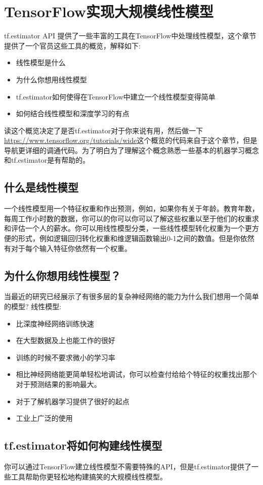 \section{TensorFlow实现大规模线性模型}
tf.estimator API 提供了一些丰富的工具在TensorFlow中处理线性模型，这个章节提供了一个官员这些工具的概览，解释如下:
\begin{itemize}
  \item 线性模型是什么
  \item 为什么你想用线性模型
  \item tf.estimator如何使得在TensorFlow中建立一个线性模型变得简单
  \item 如何结合线性模型和深度学习的有点
\end{itemize}
读这个概览决定了是否tf.estimator对于你来说有用，然后做一下\href{Models tutorial}{https://www.tensorflow.org/tutorials/wide}这个概览的代码来自于这个章节，但是导航更详细的调通代码。为了明白为了理解这个概念熟悉一些基本的机器学习概念和tf.estimator是有帮助的。
\subsection{什么是线性模型}
一个线性模型用一个特征权重和作出预测，例如，如果你有关于年龄。教育年数，每周工作小时数的数据，你可以的你可以你可以了解这些权重以至于他们的权重求和评估一个人的薪水。你可以用线性模型分类，一些线性模型转化权重为一个更方便的形式，例如逻辑回归转化权重和维逻辑函数输出0-1之间的数值。但是你依然有对于每个输入特征你依然有一个权重。
\subsection{为什么你想用线性模型？}
当最近的研究已经展示了有很多层的复杂神经网络的能力为什么我们想用一个简单的模型?\newline
线性模型:
\begin{itemize}
  \item 比深度神经网络训练快速
  \item 在大型数据及上也能工作的很好
  \item 训练的时候不要求微小的学习率
  \item 相比神经网络能更简单轻松地调试，你可以检查付给给个特征的权重找出那个对于预测结果的影响最大。
  \item 对于了解机器学习提供了很好的起点
  \item 工业上广泛的使用
\end{itemize}
\subsection{tf.estimator将如何构建线性模型}
你可以通过TensorFlow建立线性模型不需要特殊的API，但是tf.estimator提供了一些工具帮助你更轻松地构建搞笑的大规模线性模型。
